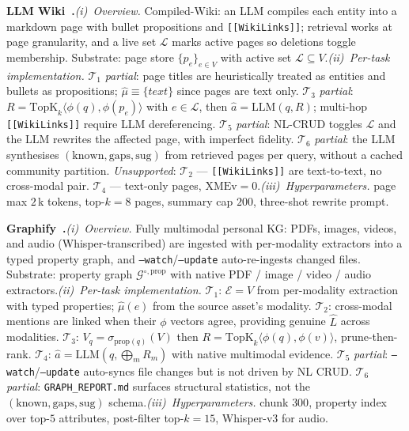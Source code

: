 \documentclass{article}
\begin{document}
\noindent\textbf{LLM Wiki~\citep{LLMWiki}.}\quad\emph{(i)~Overview.} Compiled-Wiki: an LLM compiles each entity into a markdown page with bullet propositions and \texttt{[[WikiLinks]]}; retrieval works at page granularity, and a live set $\mathcal{L}$ marks active pages so deletions toggle membership. Substrate: page store $\{p_e\}_{e\in V}$ with active set $\mathcal{L}\!\subseteq\!V$.\quad\emph{(ii)~Per-task implementation.} $\mathcal{T}_1$ \emph{partial}: page titles are heuristically treated as entities and bullets as propositions; $\hat{\mu}\!\equiv\!\{\textit{text}\}$ since pages are text only. $\mathcal{T}_3$ \emph{partial}: $R\!=\!\mathrm{TopK}_{k}\!\langle\phi(q),\phi(p_e)\rangle$ with $e\!\in\!\mathcal{L}$, then $\hat{a}\!=\!\mathrm{LLM}(q,R)$; multi-hop \texttt{[[WikiLinks]]} require LLM dereferencing. $\mathcal{T}_5$ \emph{partial}: NL-CRUD toggles $\mathcal{L}$ and the LLM rewrites the affected page, with imperfect fidelity. $\mathcal{T}_6$ \emph{partial}: the LLM synthesises $(\mathrm{known},\mathrm{gaps},\mathrm{sug})$ from retrieved pages per query, without a cached community partition. \emph{Unsupported}: $\mathcal{T}_2$ — \texttt{[[WikiLinks]]} are text-to-text, no cross-modal pair. $\mathcal{T}_4$ — text-only pages, $\mathrm{XMEv}\!=\!0$.\quad\emph{(iii)~Hyperparameters.} page max $2$\,k tokens, top-$k\!=\!8$ pages, summary cap $200$, three-shot rewrite prompt.

\noindent\textbf{Graphify~\citep{Graphify}.}\quad\emph{(i)~Overview.} Fully multimodal personal KG: PDFs, images, videos, and audio (Whisper-transcribed) are ingested with per-modality extractors into a typed property graph, and \texttt{--watch}/\texttt{--update} auto-re-ingests changed files. Substrate: property graph $\mathcal{G}^{\circ,\mathrm{prop}}$ with native PDF / image / video / audio extractors.\quad\emph{(ii)~Per-task implementation.} $\mathcal{T}_1$: $\hat{\mathcal{E}}\!=\!V$ from per-modality extraction with typed properties; $\hat{\mu}(e)$ from the source asset's modality. $\mathcal{T}_2$: cross-modal mentions are linked when their $\phi$ vectors agree, providing genuine $\hat{L}$ across modalities. $\mathcal{T}_3$: $V_q\!=\!\sigma_{\mathrm{prop}(q)}(V)$ then $R\!=\!\mathrm{TopK}_{k}\!\langle\phi(q),\phi(v)\rangle$, prune-then-rank. $\mathcal{T}_4$: $\hat{a}\!=\!\mathrm{LLM}(q,\bigoplus_m R_m)$ with native multimodal evidence. $\mathcal{T}_5$ \emph{partial}: \texttt{--watch}/\texttt{--update} auto-syncs file changes but is not driven by NL CRUD. $\mathcal{T}_6$ \emph{partial}: \texttt{GRAPH\_REPORT.md} surfaces structural statistics, not the $(\mathrm{known},\mathrm{gaps},\mathrm{sug})$ schema.\quad\emph{(iii)~Hyperparameters.} chunk $300$, property index over top-$5$ attributes, post-filter top-$k\!=\!15$, Whisper-v3 for audio.
\end{document}
